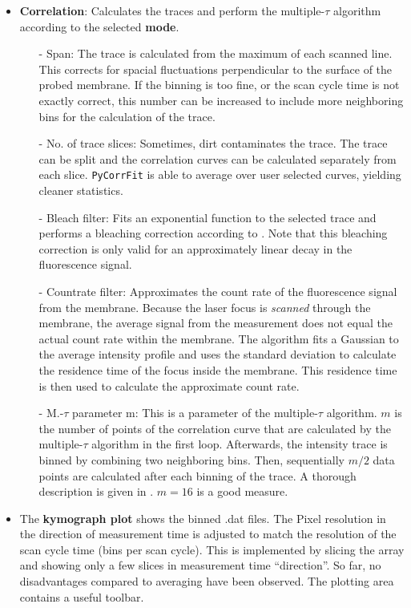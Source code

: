 \begin{itemize}
\item \textbf{Correlation}: Calculates the traces and perform the multiple-$\tau$ algorithm according to the selected \textbf{mode}. 
	\begin{itemize}
	\item[-] Span: The trace is calculated from the maximum of each scanned line. This corrects for spacial fluctuations perpendicular to the surface of the probed membrane. If the binning is too fine, or the scan cycle time is not exactly correct, this number can be increased to include more neighboring bins for the calculation of the trace.
	\item[-] No. of trace slices: Sometimes, dirt contaminates the trace. The trace can be split and the correlation curves can be calculated separately from each slice. \texttt{PyCorrFit} is able to average over user selected curves, yielding cleaner statistics.
	\item[-] Bleach filter: Fits an exponential function to the selected trace and performs a bleaching correction according to \cite{Ries2009}. Note that this bleaching correction is only valid for an approximately linear decay in the fluorescence signal.
	\item[-] Countrate filter: Approximates the count rate of the fluorescence signal from the membrane. Because the laser focus is \textit{scanned} through the membrane, the average signal from the measurement does not equal the actual count rate within the membrane. The algorithm fits a Gaussian to the average intensity profile and uses the standard deviation to calculate the residence time of the focus inside the membrane.	This residence time is then used to calculate the approximate count rate.
	\item[-] M.-$\tau$ parameter m: This is a parameter of the multiple-$\tau$ algorithm. $m$ is the number of points of the correlation curve that are calculated by the multiple-$\tau$ algorithm in the first loop. Afterwards, the intensity trace is binned by combining two neighboring bins. Then, sequentially $m/2$ data points are calculated after each binning of the trace. A thorough description is given in \cite{Wohland2001}. $m=16$ is a good measure.

	\end{itemize}
\item The \textbf{kymograph plot} shows the binned \mytilde .dat files. The Pixel resolution in the direction of measurement time is adjusted to match the resolution of the scan cycle time (bins per scan cycle). This is implemented by slicing the array and showing only a few slices in measurement time ``direction''. So far, no disadvantages compared to averaging have been observed. The plotting area contains a useful toolbar.
\end{itemize}

